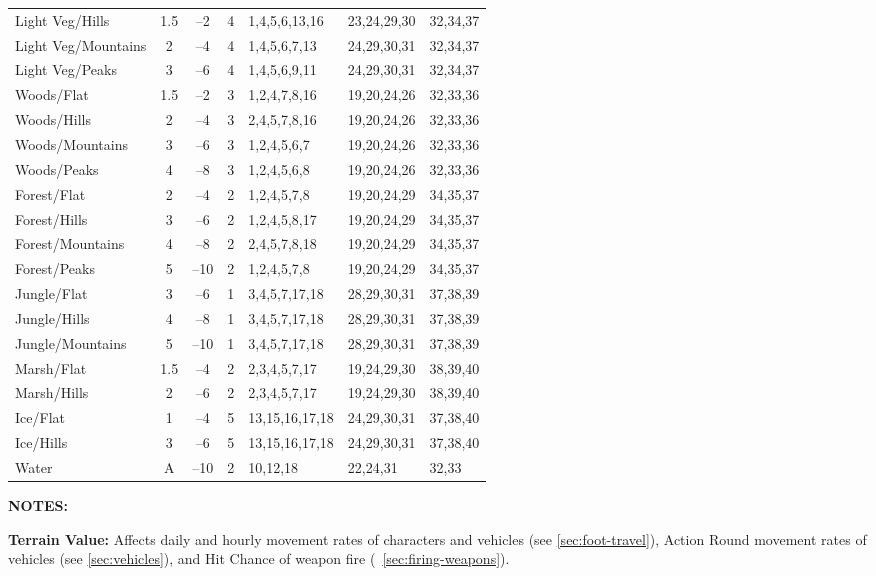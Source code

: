 \begin{table}[htbp]
{\begin{minipage}{0.95\textwidth}
\begin{tabular}{lccclll}
\rowcolor{grey}
Light Veg/Hills & 1.5 & --2 & 4 & 1,4,5,6,13,16 & 23,24,29,30 & 32,34,37\\
Light Veg/Mountains & 2 & --4 & 4 & 1,4,5,6,7,13 & 24,29,30,31 & 32,34,37\\
\rowcolor{grey}
Light Veg/Peaks & 3 & --6 & 4 & 1,4,5,6,9,11 & 24,29,30,31 & 32,34,37\\
\hline
Woods/Flat & 1.5 & --2 & 3 & 1,2,4,7,8,16 & 19,20,24,26 & 32,33,36\\
\rowcolor{grey}
Woods/Hills & 2 & --4 & 3 & 2,4,5,7,8,16 & 19,20,24,26 & 32,33,36\\
Woods/Mountains & 3 & --6 & 3 & 1,2,4,5,6,7 & 19,20,24,26 & 32,33,36\\
\rowcolor{grey}
Woods/Peaks & 4 & --8 & 3 & 1,2,4,5,6,8 & 19,20,24,26 & 32,33,36\\
\hline
Forest/Flat & 2 & --4 & 2 & 1,2,4,5,7,8 & 19,20,24,29 & 34,35,37\\
\rowcolor{grey}
Forest/Hills & 3 & --6 & 2 & 1,2,4,5,8,17 & 19,20,24,29 & 34,35,37\\
Forest/Mountains & 4 & --8 & 2 & 2,4,5,7,8,18 & 19,20,24,29 & 34,35,37\\
\rowcolor{grey}
Forest/Peaks & 5 & --10 & 2 & 1,2,4,5,7,8 & 19,20,24,29 & 34,35,37\\
\hline
Jungle/Flat & 3 & --6 & 1 & 3,4,5,7,17,18 & 28,29,30,31 & 37,38,39\\
\rowcolor{grey}
Jungle/Hills & 4 & --8 & 1 & 3,4,5,7,17,18 & 28,29,30,31 & 37,38,39\\
Jungle/Mountains & 5 & --10 & 1 & 3,4,5,7,17,18 & 28,29,30,31 & 37,38,39\\
\rowcolor{grey}
\hline
Marsh/Flat & 1.5 & --4 & 2 & 2,3,4,5,7,17 & 19,24,29,30 & 38,39,40\\
Marsh/Hills & 2 & --6 & 2 & 2,3,4,5,7,17 & 19,24,29,30 & 38,39,40\\
\rowcolor{grey}
\hline
Ice/Flat & 1 & --4 & 5 & 13,15,16,17,18 & 24,29,30,31 & 37,38,40\\
Ice/Hills & 3 & --6 & 5 & 13,15,16,17,18 & 24,29,30,31 & 37,38,40\\
\rowcolor{grey}
\hline
Water & A & --10 & 2 & 10,12,18 & 22,24,31 & 32,33 
      \end{tabular}

      \medskip

      \parbox{\textwidth}{\textbf{NOTES:}
        
        \textbf{Terrain Value:} Affects daily and hourly movement
        rates of characters and vehicles (see \ref{sec:foot-travel}),
        Action Round movement rates of vehicles (see
        \ref{sec:vehicles}), and Hit Chance of weapon fire
        (~\ref{sec:firing-weapons}).
        
}
\end{minipage}}
\end{table}
